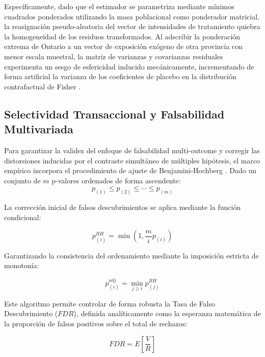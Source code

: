 Espec\'ificamente, dado que el estimador se parametriza mediante m\'inimos cuadrados ponderados utilizando la masa poblacional como ponderador matricial, la reasignaci\'on pseudo-aleatoria del vector de intensidades de tratamiento quiebra la homogeneidad de los residuos transformados. Al adscribir la ponderaci\'on extrema de Ontario a un vector de exposici\'on ex\'ogeno de otra provincia con menor escala muestral, la matriz de varianzas y covarianzas residuales experimenta un sesgo de esfericidad inducido mec\'anicamente, incrementando de forma artificial la varianza de los coeficientes de placebo en la distribuci\'on contrafactual de Fisher \citep{fisher1966design}.

\subsection{Selectividad Transaccional y Falsabilidad Multivariada}
\label{sec:A_5}

Para garantizar la validez del enfoque de falsabilidad multi-outcome y corregir las distorsiones inducidas por el contraste simult\'aneo de m\'ultiples hip\'otesis, el marco emp\'irico incorpora el procedimiento de ajuste de Benjamini-Hochberg \citep{benjamini1995}. Dado un conjunto de $m$ p-valores ordenados de forma ascendente:
\begin{equation}
    p_{(1)} \le p_{(2)} \le \cdots \le p_{(m)}
\end{equation}

La correcci\'on inicial de falsos descubrimientos se aplica mediante la funci\'on condicional:

\begin{equation}
    p^{BH}_{(i)} = \min \left( 1, \frac{m}{i} p_{(i)} \right)
\end{equation}

Garantizando la consistencia del ordenamiento mediante la imposici\'on estricta de monoton\'ia:

\begin{equation}
    p^{adj}_{(i)} = \min_{j \ge i} p^{BH}_{(j)}
\end{equation}

Este algoritmo permite controlar de forma robusta la Tasa de Falso Descubrimiento ($FDR$), definida anal\'iticamente como la esperanza matem\'atica de la proporci\'on de falsos positivos sobre el total de rechazos:

\begin{equation}
    FDR = \textit{$E$} \left[ \frac{V}{R} \right]
\end{equation}

